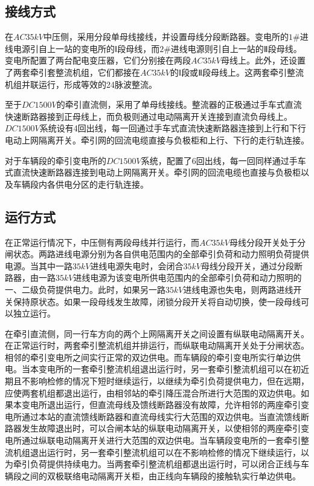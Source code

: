 \subsection{接线方式}
在$AC35kV$中压侧，采用分段单母线接线，并设置母线分段断路器。变电所的$1\#$进线电源引自上一站的变电所的$Ⅰ$段母线，而$2\#$进线电源则引自上一站的$Ⅱ$段母线。变电所配置了两台配电变压器，它们分别接在两段$AC35kV$母线上。此外，还设置了两套牵引套整流机组，它们都接在$AC35kV$的$Ⅰ$段或$Ⅱ$段母线上。这两套牵引整流机组并联运行，形成等效的24脉波整流。


至于$DC1500V$的牵引直流侧，采用了单母线接线。整流器的正极通过手车式直流快速断路器接到正母线上，而负极则通过电动隔离开关连接到直流负母线上。$DC1500V$系统设有4回出线，每一回通过手车式直流快速断路器连接到上行和下行电动上网隔离开关。牵引网的回流电缆直接与负极柜和上行、下行的走行轨连接。


对于车辆段的牵引变电所的$DC1500V$系统，配置了6回出线，每一回同样通过手车式直流快速断路器连接到电动上网隔离开关。牵引网的回流电缆也直接与负极柜以及车辆段内各供电分区的走行轨连接。

\subsection{运行方式}
在正常运行情况下，中压侧有两段母线并行运行，而$AC35kV$母线分段开关处于分闸状态。两路进线电源分别为各自供电范围内的全部牵引负荷和动力照明负荷提供电源。当其中一路$35kV$进线电源失电时，会闭合$35kV$母线分段开关，通过分段断路器，由一路$35kV$进线电源为该变电所供电范围内的全部牵引负荷和动力照明的一、二级负荷提供电力。此时，如果另一路$35kV$进线电源也失电，则两路进线开关保持原状态。如果一段母线发生故障，闭锁分段开关将自动切换，使一段母线可以独立运行。


在牵引直流侧，同一行车方向的两个上网隔离开关之间设置有纵联电动隔离开关。在正常运行时，两套牵引整流机组并排运行，而纵联电动隔离开关处于分闸状态。相邻的牵引变电所之间实行正常的双边供电。而车辆段的牵引变电所实行单边供电。当本变电所的一套牵引整流机组退出运行时，另一套牵引整流机组可以在初近期且不影响检修的情况下短时继续运行，以继续为牵引负荷提供电力，但在远期，应使两套机组都退出运行，由相邻站的牵引降压混合所进行大范围的双边供电。如果本变电所退出运行，但直流母线及馈线断路器没有故障，允许相邻的两座牵引变电所通过本站的直流馈线断路器和直流母线实行大范围的双边供电。当直流馈线断路器发生故障退出时，可以合闸本站的纵联电动隔离开关，以使相邻的两座牵引变电所通过纵联电动隔离开关进行大范围的双边供电。当车辆段变电所的一套牵引整流机组退出运行时，另一套牵引整流机组可以在不影响检修的情况下继续运行，以为牵引负荷提供持续电力。当两套牵引整流机组都退出运行时，可以闭合正线与车辆段之间的双极联络电动隔离开关柜，由正线向车辆段的接触轨实行单边供电。

